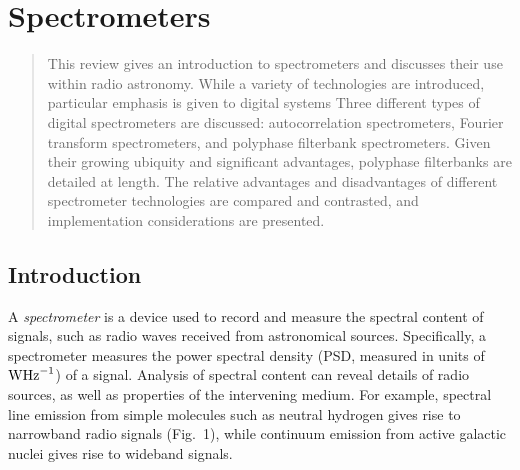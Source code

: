 \documentclass{ws-rv961x669}
\begin{document}
\chapter[Spectrometers]{Spectrometers}\label{spec_chap}

\author[D. Price and J. Hickish]{Danny C. Price and J. Hickish}

\address{Department of Astronomy, Campbell Hall 339 \\
University of California at Berkeley,\\
Berkeley, CA 94720-3411 \\
dancpr@berkeley.edu}

\begin{abstract}
This review gives an introduction to spectrometers and discusses their use within radio astronomy. While a variety of technologies are introduced, particular emphasis is given to digital systems
Three different types of digital spectrometers are discussed: autocorrelation spectrometers, Fourier transform spectrometers, and polyphase filterbank spectrometers.  Given their growing ubiquity and significant advantages, polyphase filterbanks are detailed at length. The relative advantages and disadvantages of different spectrometer technologies are compared and contrasted, and implementation considerations are presented.

\end{abstract}


\body

\section{Introduction}\label{sec:intro}

A \emph{spectrometer} is a device used to record and measure the spectral content of signals, such as radio waves received from astronomical sources. Specifically, a spectrometer measures the power spectral density (PSD, measured in units of $\rm{WHz}^{-1}$) of a signal. Analysis of spectral content can reveal details of radio sources, as well as properties of the intervening medium. For example, spectral line emission from simple molecules such as neutral hydrogen gives rise to narrowband radio signals (Fig.~1), while continuum emission from active galactic nuclei gives rise to wideband signals.
\end{document}
